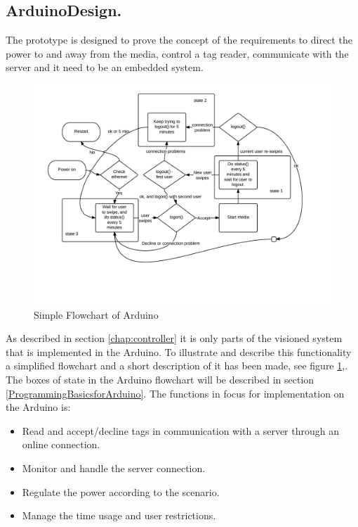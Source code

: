 \subsection{ArduinoDesign.}    

The prototype is designed to prove the concept of the requirements to direct the power to and away from the media, control a tag reader, communicate with the server and it need to be an embedded system. \newline

\begin{figure}[h]
	\centering
		\includegraphics{images/arduinoFlowchart.png}
	\caption{Simple Flowchart of Arduino}
	\label{fig:arduinoFlowchart}
\end{figure}

As described in section \ref{chap:controller} it is only parts of the visioned system that is implemented in  the Arduino. 
To illustrate and describe this functionality a simplified flowchart and a short description of it has been made, see figure \ref{fig:arduinoFlowchart},. The boxes of state in the Arduino flowchart will be described in section \ref{ProgrammingBasicsforArduino}.
The functions in focus for implementation on the Arduino is: 

\begin{itemize}
	\item Read and accept/decline tags in communication with a server through an online connection.
	\item Monitor and handle the server connection.
	\item Regulate the power according to the scenario.
	\item Manage the time usage and user restrictions. 
\end{itemize}

